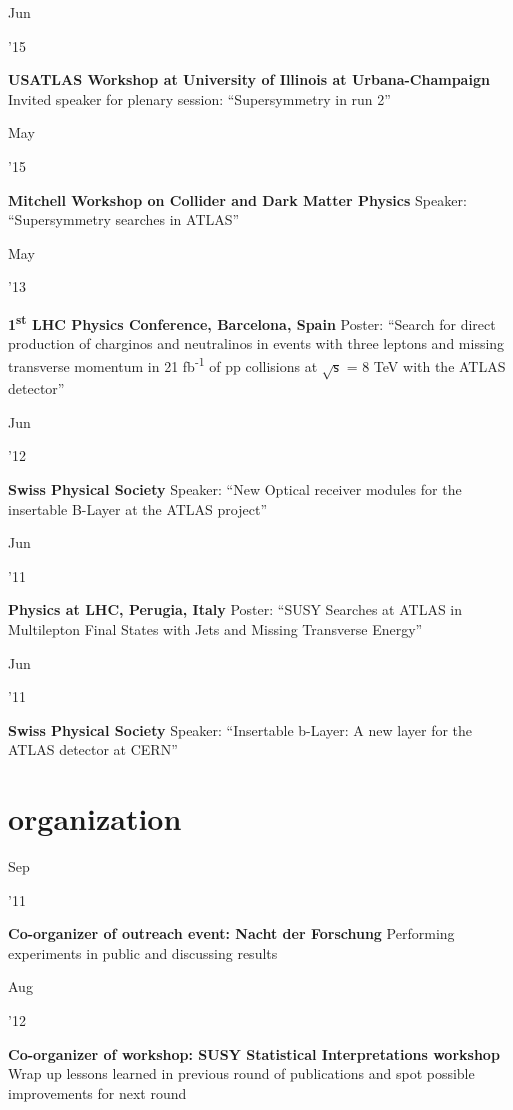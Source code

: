 \documentclass[]{cv} %
\begin{document}
\begin{entrylist}

  \entry
  {\parbox[t]{\parboxWidthOne}{Jun}\parbox[t]{\parboxWidthTwo}{\hfill '15}}
  {\textbf{USATLAS Workshop at University of Illinois at Urbana-Champaign}}
  {}
  {Invited speaker for plenary session: ``Supersymmetry in run 2''}

  \entry
  {\parbox[t]{\parboxWidthOne}{May}\parbox[t]{\parboxWidthTwo}{\hfill '15}}
  {\textbf{Mitchell Workshop on Collider and Dark Matter Physics}}
  {\href{}{}}
  {Speaker: ``Supersymmetry searches in ATLAS''}

  \entry
  {\parbox[t]{\parboxWidthOne}{May}\parbox[t]{\parboxWidthTwo}{\hfill '13}}
  {\textbf{1\textsuperscript{st} LHC Physics Conference, Barcelona, Spain}}
  {}
  {Poster: ``Search for direct production of charginos and neutralinos in events with three
    leptons and missing transverse momentum in 21 fb\textsuperscript{-1} of pp collisions at $\sqrt{\mathsf{s}}$ = 8 TeV with the ATLAS
  detector''}

  \entry
  {\parbox[t]{\parboxWidthOne}{Jun}\parbox[t]{\parboxWidthTwo}{\hfill '12}}
  {\textbf{Swiss Physical Society}}
  {}
  {Speaker: ``New Optical receiver modules for the insertable B-Layer at the ATLAS project''}

  \entry
  {\parbox[t]{\parboxWidthOne}{Jun}\parbox[t]{\parboxWidthTwo}{\hfill '11}}
  {\textbf{Physics at LHC, Perugia, Italy}}
  {}
  {Poster: ``SUSY Searches at ATLAS in Multilepton Final States with Jets and Missing Transverse Energy''}

  \entry
  {\parbox[t]{\parboxWidthOne}{Jun}\parbox[t]{\parboxWidthTwo}{\hfill '11}}
  {\textbf{Swiss Physical Society}}
  {}
  {Speaker: ``Insertable b-Layer: A new layer for the ATLAS detector at CERN''}

\end{entrylist}

\section{organization}

\begin{entrylist}

  \entry
  {\parbox[t]{\parboxWidthOne}{Sep}\parbox[t]{\parboxWidthTwo}{\hfill '11}}
  {\textbf{Co-organizer of outreach event: Nacht der Forschung}}
  {}
  {Performing experiments in public and discussing results}

  \entry
  {\parbox[t]{\parboxWidthOne}{Aug}\parbox[t]{\parboxWidthTwo}{\hfill '12}}
  {\textbf{Co-organizer of workshop: SUSY Statistical Interpretations workshop}}
  {}
  {Wrap up lessons learned in previous round of publications and spot possible
  improvements for next round}

\end{entrylist}
\end{document}
